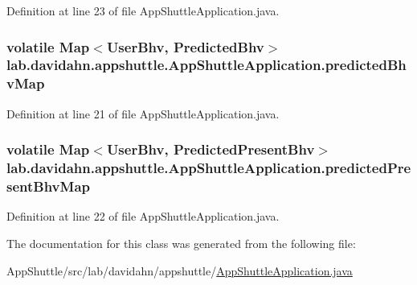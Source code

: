 \-Definition at line 23 of file \-App\-Shuttle\-Application.\-java.

\hypertarget{classlab_1_1davidahn_1_1appshuttle_1_1_app_shuttle_application_a3a70bde7b271c3e7d4aaf83df91d4b41}{
\subsubsection[{predicted\-Bhv\-Map}]{\setlength{\rightskip}{0pt plus 5cm}volatile \-Map$<${\bf \-User\-Bhv}, {\bf \-Predicted\-Bhv}$>$ {\bf lab.\-davidahn.\-appshuttle.\-App\-Shuttle\-Application.\-predicted\-Bhv\-Map}}}\label{classlab_1_1davidahn_1_1appshuttle_1_1_app_shuttle_application_a3a70bde7b271c3e7d4aaf83df91d4b41}


\-Definition at line 21 of file \-App\-Shuttle\-Application.\-java.

\hypertarget{classlab_1_1davidahn_1_1appshuttle_1_1_app_shuttle_application_aae8fb9f870346c2665884100497a83cf}{
\subsubsection[{predicted\-Present\-Bhv\-Map}]{\setlength{\rightskip}{0pt plus 5cm}volatile \-Map$<${\bf \-User\-Bhv}, {\bf \-Predicted\-Present\-Bhv}$>$ {\bf lab.\-davidahn.\-appshuttle.\-App\-Shuttle\-Application.\-predicted\-Present\-Bhv\-Map}}}\label{classlab_1_1davidahn_1_1appshuttle_1_1_app_shuttle_application_aae8fb9f870346c2665884100497a83cf}


\-Definition at line 22 of file \-App\-Shuttle\-Application.\-java.



\-The documentation for this class was generated from the following file\-:\begin{DoxyCompactItemize}
\item 
\-App\-Shuttle/src/lab/davidahn/appshuttle/\hyperlink{_app_shuttle_application_8java}{\-App\-Shuttle\-Application.\-java}\end{DoxyCompactItemize}
